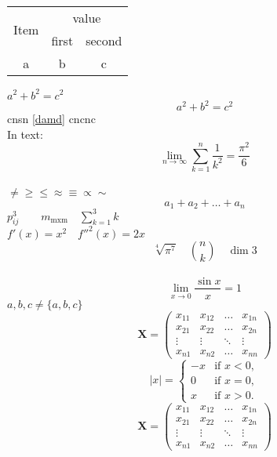 \documentclass[UTF8]{ctexart}
\begin{document}
\begin{tabular}{ccc}
\hline
\multirow{2}{*}{Item} &\multicolumn{2}{c}{value} \\
\cline{2-3}
&first & second \\
a &b &c \\
\hline
\end{tabular}
$a^2+b^2=c^2$
\begin{equation}
a^2+b^2=c^2 \tag{123}\label{damd}
\end{equation}
cnsn \eqref{damd} cncnc \\
In text:
\[\lim_{n\to\infty} \sum_{k=1}^n \frac{1}{k^2}=\frac{\pi^2}{6}\] \\
$ \ne \ge \le \approx \equiv \propto \sim $  \\
\[a_1+a_2+\dots+a_n\]
$p_{ij}^3 \qquad m_{\text{mxm}}\quad \sum_{k=1}^3 k$\\
$f'(x)=x^2\quad f''^2(x)=2x$
\[\sqrt[4]{\pi^7} \quad \binom{n}{k}\quad \dim{3}\]\\
\[\lim_{x \rightarrow 0}\frac{\sin x}{x}=1\]
$ a,b,c \ne \{ a,b,c\} $
\[ \mathbf{X}= \left( \begin{array}{cccc}
x_{11} & x_{12} &\ldots &x_{1n} \\
x_{21} & x_{22} &\ldots &x_{2n} \\
\vdots & \vdots &\ddots &\vdots \\
x_{n1} & x_{n2} &\ldots &x_{nn}
\end{array} \right) \]
\[ |x|=\left\{  \begin{array}{lr}
-x & \text{if } x<0,\\
0 &\text{if } x=0,\\
x &\text{if } x>0.
\end{array}\right. \]
\[ \mathbf{X}=\begin{pmatrix}
x_{11} & x_{12} &\ldots &x_{1n} \\
x_{21} & x_{22} &\ldots &x_{2n} \\
\vdots & \vdots &\ddots &\vdots \\
x_{n1} & x_{n2} &\ldots &x_{nn}
\end{pmatrix} \]
\end{document}
